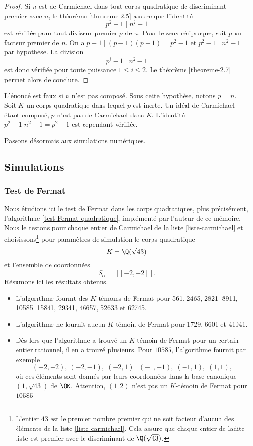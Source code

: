 \begin{proof}
	Si $n$ est de Carmichael dans tout corps quadratique de discriminant premier avec $n$, le théorème \ref{theoreme-2.5} assure que l'identité \[p^2 - 1 \mid n^2 - 1\] est vérifiée pour tout diviseur premier $p$ de $n$. Pour le sens réciproque, soit $p$ un facteur premier de $n$. On a $p-1\mid (p-1)(p+1) = p^2 - 1$ et $p^2 - 1 \mid n^2 - 1$ par hypothèse. La division \[p^i - 1 \mid n^2 - 1\] est donc vérifiée pour toute puissance $1\leq i \leq 2$. Le théorème \ref{theoreme-2.7} permet alors de conclure.
\end{proof}

\begin{remarque}
	L'énoncé est faux si $n$ n'est pas composé. Sous cette hypothèse, notons $p=n$. Soit $K$ un corps quadratique dans lequel $p$ est inerte. Un idéal de Carmichael étant composé, $p$ n'est pas de Carmichael dans $K$. L'identité $p^2 - 1 | n^2 - 1 = p^2 - 1$ est cependant vérifiée.
\end{remarque}

Passons désormais aux simulations numériques.

\subsection{Simulations}

\subsubsection{Test de Fermat}

Nous étudions ici le test de Fermat dans les corps quadratiques, plus précisément, l'algorithme \ref{test-Fermat-quadratique}, implémenté par l'auteur de ce mémoire. Nous le testons pour chaque entier de Carmichael de la liste \ref{liste-carmichael} et choisissons\footnote{L'entier $43$ est le premier nombre premier qui ne soit facteur d'aucun des éléments de la liste \ref{liste-carmichael}. Cela assure que chaque entier de ladite liste est premier avec le discriminant de $\Q(\sqrt{43})$.} pour paramètres de simulation le corps quadratique \[K = \Q(\sqrt{43})\] et l'ensemble de coordonnées \[S_\alpha = [\![-2, +2]\!].\] Résumons ici les résultats obtenus.
\begin{itemize}
	\item L'algorithme fournit des $K$-témoins de Fermat pour 561, 2465, 2821, 8911, 10585, 15841, 29341, 46657, 52633 et 62745.
	\item L'algorithme ne fournit aucun $K$-témoin de Fermat pour 1729, 6601 et 41041.
	\item Dès lors que l'algorithme a trouvé un $K$-témoin de Fermat pour un certain entier rationnel, il en a trouvé plusieurs. Pour $10585$, l'algorithme fournit par exemple \[(-2, -2), \; (-2, -1), \; (-2, 1), \; (-1, -1), \; (-1, 1), \; (1, 1),\] où ces éléments sont donnés par leurs coordonnées dans la base canonique $(1, \sqrt{43})$ de $\OK$. Attention, $(1, 2)$ n'est pas un $K$-témoin de Fermat pour $10585$.
\end{itemize}

